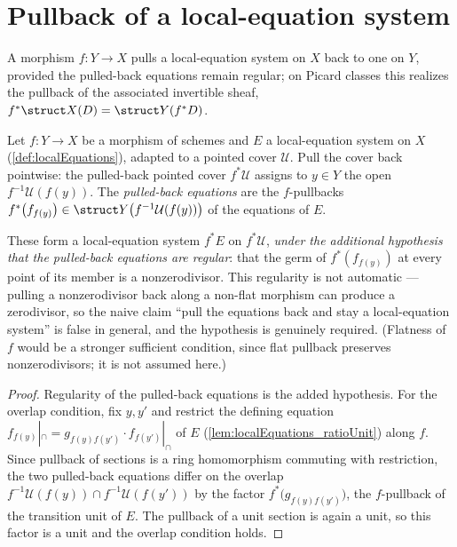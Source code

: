 \section{Pullback of a local-equation system}

A morphism \(f \colon Y \to X\) pulls a local-equation system on \(X\) back to one on \(Y\),
provided the pulled-back equations remain regular; on Picard classes this realizes the pullback of
the associated invertible sheaf, \(f^{*}\struct X(D) = \struct Y(f^{*}D)\).

\begin{definition}
  \label{def:localEquations_pullback}
  \leanok
  Let \(f \colon Y \to X\) be a morphism of schemes and \(E\) a local-equation system on \(X\)
  (\ref{def:localEquations}), adapted to a pointed cover \(\mathcal U\). Pull the cover back
  pointwise: the pulled-back pointed cover \(f^{*}\mathcal U\) assigns to \(y \in Y\) the open
  \(f^{-1}\mathcal U(f(y))\). The \emph{pulled-back equations} are the \(f\)-pullbacks
  \(f^{*}\bigl(f_{f(y)}\bigr) \in \struct Y\bigl(f^{-1}\mathcal U(f(y))\bigr)\) of the equations of
  \(E\).

  These form a local-equation system \(f^{*}E\) on \(f^{*}\mathcal U\), \emph{under the additional
  hypothesis that the pulled-back equations are regular}: that the germ of \(f^{*}(f_{f(y)})\) at
  every point of its member is a nonzerodivisor. This regularity is not automatic --- pulling a
  nonzerodivisor back along a non-flat morphism can produce a zerodivisor, so the naive claim
  ``pull the equations back and stay a local-equation system'' is false in general, and the
  hypothesis is genuinely required. (Flatness of \(f\) would be a stronger sufficient condition,
  since flat pullback preserves nonzerodivisors; it is not assumed here.)
\end{definition}
\begin{proof}
  \leanok
  Regularity of the pulled-back equations is the added hypothesis. For the overlap condition, fix
  \(y, y'\) and restrict the defining equation
  \(f_{f(y)}|_{\cap} = g_{f(y)f(y')}\cdot f_{f(y')}|_{\cap}\) of \(E\)
  (\ref{lem:localEquations_ratioUnit}) along \(f\). Since pullback of sections is a ring
  homomorphism commuting with restriction, the two pulled-back equations differ on the overlap
  \(f^{-1}\mathcal U(f(y)) \cap f^{-1}\mathcal U(f(y'))\) by the factor
  \(f^{*}\bigl(g_{f(y)f(y')}\bigr)\), the \(f\)-pullback of the transition unit of \(E\). The
  pullback of a unit section is again a unit, so this factor is a unit and the overlap condition
  holds.
\end{proof}

